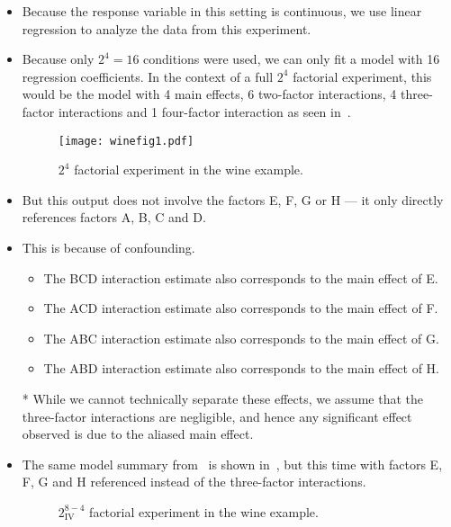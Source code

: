 \begin{itemize}
\begin{table}[!htbp]
\begin{tabular}{cccccccccc}
                  \end{tabular}
            \end{table}
      \item Because the response variable in this setting is continuous, we use linear regression to analyze the data
            from this experiment.
      \item Because only $2^4=16$ conditions were used, we can only fit a model with 16 regression coefficients. In
            the context of a full $2^4$ factorial experiment, this would be the model with 4 main effects, 6 two-factor
            interactions, 4 three-factor interactions and 1 four-factor interaction as seen in~.
            \begin{figure}[!htbp]
                  \centering
                  \caption{$ 2^4 $ factorial experiment in the wine example.}\label{fig:winefig1}
                  \texttt{[image: winefig1.pdf]}
            \end{figure}
      \item But this output does not involve the factors E, F, G or H –-- it only directly references factors A, B, C
            and D.
      \item This is because of confounding.
            \begin{itemize}
                  \item The BCD interaction estimate also corresponds to the main effect of E.
                  \item The ACD interaction estimate also corresponds to the main effect of F.
                  \item The ABC interaction estimate also corresponds to the main effect of G.
                  \item The ABD interaction estimate also corresponds to the main effect of H.
            \end{itemize}
      \item[*] While we cannot technically separate these effects, we assume that the three-factor interactions are
            negligible, and hence any significant effect observed is due to the aliased main effect.
      \item The same model summary from~ is shown in~, but this time with factors E, F, G and H
            referenced instead of the three-factor interactions.
            \begin{figure}[!htbp]
                  \centering
                  \caption{$ 2^{8-4}_{\text{IV}} $ factorial experiment in the wine example.}\label{fig:winefig2}

\end{figure}
\end{itemize}
